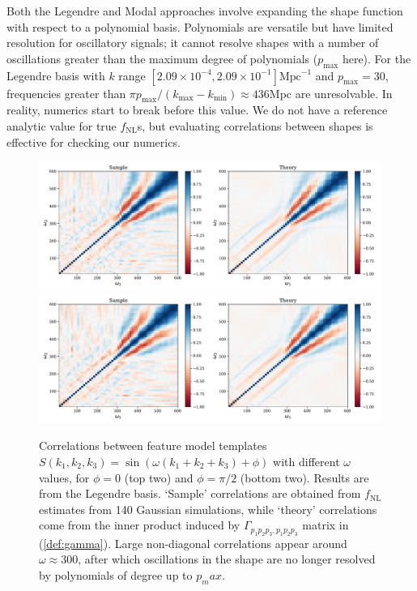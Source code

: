 Both the Legendre and Modal approaches involve expanding the shape function with respect to a polynomial basis. Polynomials are versatile but have limited resolution for oscillatory signals; it cannot resolve shapes with a number of oscillations greater than the maximum degree of polynomials ($p_\text{max}$ here). For the Legendre basis with $k$ range $[2.09\times 10^{-4}, 2.09\times 10^{-1}]\text{Mpc}^{-1}$ and $p_\text{max}=30$, frequencies greater than $\pi p_\text{max} / (k_\text{max} - k_\text{min}) \approx 436$Mpc are unresolvable. In reality, numerics start to break before this value. We do not have a reference analytic value for true $f_\text{NL}$s, but evaluating correlations between shapes is effective for checking our numerics.

\begin{figure}[htbp!] 
	\centering    
	\includegraphics[width=\textwidth]{sine_template_correlations_new.pdf}
	\includegraphics[width=\textwidth]{cosine_template_correlations_new.pdf}
	\caption{Correlations between feature model templates $S(k_1,k_2,k_3)=\sin(\omega (k_1 + k_2 + k_3) + \phi)$ with different $\omega$ values, for $\phi = 0$ (top two) and $\phi = \pi/2$ (bottom two). Results are from the Legendre basis. `Sample' correlations are obtained from $f_\text{NL}$ estimates from 140 Gaussian simulations, while `theory' correlations come from the inner product induced by $\Gamma_{p_1 p_2 p_3, p_1 p_2 p_3}$ matrix in (\ref{def:gamma}). Large non-diagonal correlations appear around $\omega \approx 300$, after which oscillations in the shape are no longer resolved by polynomials of degree up to $p_max$.}
	\label{fig:feature_template_correlations}
\end{figure}

